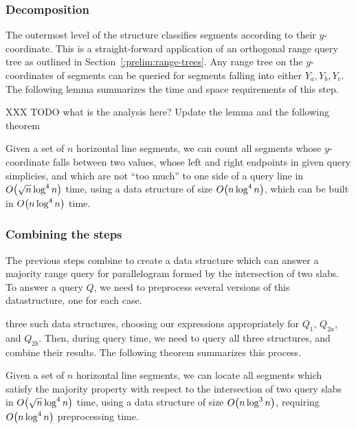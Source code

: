 \subsubsection{Decomposition}

The outermost level of the structure classifies segments according to their $y$-coordinate. This is a straight-forward application of an orthogonal range query tree as outlined in Section~\ref{:prelim:range-trees}.  Any range tree on the $y$-coordinates of segments can be queried for segments falling into either $Y_a, Y_b, Y_c$. The following lemma summarizes the time and space requirements of this step.

XXX TODO what is the analysis here?  Update the lemma and the following theorem

\begin{lemma}
\label{lem:slabs:two:step4}
Given a set of $n$ horizontal line segments, we can count all segments whose $y$-coordinate falls between two values, whose left and right endpoints in given query simplicies, and which are not ``too much'' to one side of a query line in $O\!\left(\sqrt{n}\log^4{n}\right)$ time, using a data structure of size $O\!\left(n\log^4{n}\right)$, which can be built in $O\!\left(n\log^4{n}\right)$ time.
\end{lemma}


\subsubsection{Combining the steps}

The previous steps combine to create a data structure which can answer a majority range query for parallelogram formed by the intersection of two slabs. To answer a query $Q$, we need to preprocess several versions of this datastructure, one for each case.

 three such data structures, choosing our expressions appropriately for $Q_1$, $Q_{2a}$, and $Q_{2b}$.  Then, during query time, we need to query all three structures, and combine their results. The following theorem summarizes this process.

\begin{theorem}
\label{thm:slabs:two}
Given a set of $n$ horizontal line segments, we can locate all segments which satisfy the majority property with respect to the intersection of two query slabs in $O\!\left(\sqrt{n}\log^4{n}\right)$ time, using a data structure of size $O\!\left(n\log^3{n}\right)$, requiring $O\!\left(n\log^4{n}\right)$ preprocessing time.
\end{theorem}



